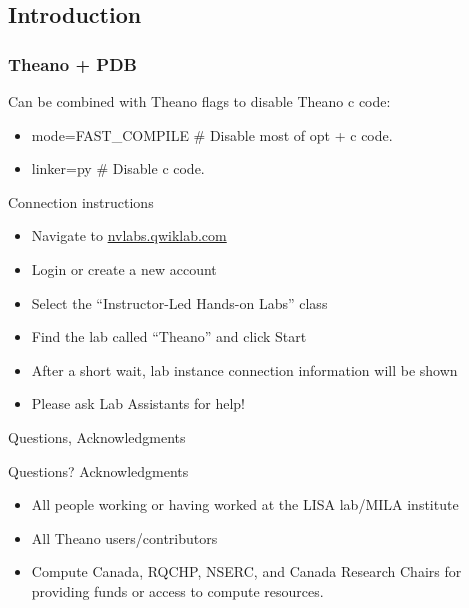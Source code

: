 \documentclass[utf8x,xcolor=pdftex,dvipsnames,table]{beamer}
\begin{document}
\subsection{Introduction}
\begin{frame}
  \frametitle{Theano + PDB}
  Can be combined with Theano flags to disable Theano c code:
  \begin{itemize}
    \item mode=FAST\_COMPILE \# Disable most of opt + c code.
    \item linker=py \# Disable c code.
  \end{itemize}
\end{frame}

\begin{frame}{Connection instructions}
\begin{itemize}
\item Navigate to \url{nvlabs.qwiklab.com}
\item Login or create a new account
\item Select the ``Instructor-Led Hands-on Labs'' class
\item Find the lab called ``Theano'' and click Start
\item After a short wait, lab instance connection information will be shown
\item Please ask Lab Assistants for help!
\end{itemize}
\end{frame}

\begin{frame}{Questions, Acknowledgments}
\Huge
\begin{center}
Questions?\newline
Acknowledgments
\end{center}
\normalsize
\begin{itemize}
\item All people working or having worked at the LISA lab/MILA institute
\item All Theano users/contributors
\item Compute Canada, RQCHP, NSERC, and Canada Research Chairs for providing funds or access to compute resources.
\end{itemize}

\end{frame}
\end{document}
